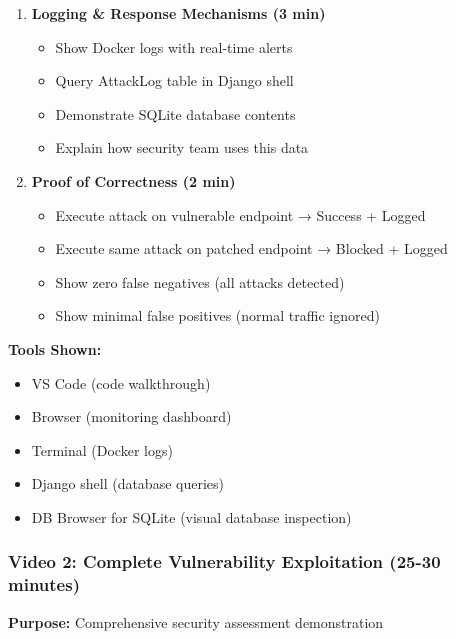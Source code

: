 \documentclass[12pt,a4paper]{article}
\begin{document}
\begin{enumerate}[leftmargin=*]
    \item \textbf{Logging \& Response Mechanisms (3 min)}
    \begin{itemize}
        \item Show Docker logs with real-time alerts
        \item Query AttackLog table in Django shell
        \item Demonstrate SQLite database contents
        \item Explain how security team uses this data
    \end{itemize}
    
    \item \textbf{Proof of Correctness (2 min)}
    \begin{itemize}
        \item Execute attack on vulnerable endpoint → Success + Logged
        \item Execute same attack on patched endpoint → Blocked + Logged
        \item Show zero false negatives (all attacks detected)
        \item Show minimal false positives (normal traffic ignored)
    \end{itemize}
\end{enumerate}

\textbf{Tools Shown:}
\begin{itemize}
    \item VS Code (code walkthrough)
    \item Browser (monitoring dashboard)
    \item Terminal (Docker logs)
    \item Django shell (database queries)
    \item DB Browser for SQLite (visual database inspection)
\end{itemize}

\subsubsection{Video 2: Complete Vulnerability Exploitation (25-30 minutes)}

\textbf{Purpose:} Comprehensive security assessment demonstration
\end{document}
